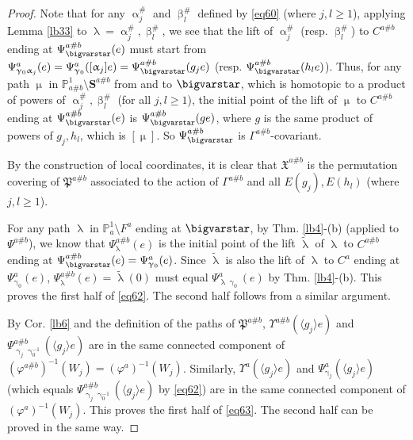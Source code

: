 \documentclass[11pt,b5paper,notitlepage]{article}
\theoremstyle{definition}
\theoremstyle{plain}
\newcommand{\fk}{\mathfrak}
\newcommand{\wtd}{\widetilde}
\newcommand{\bk}[1]{\langle {#1}\rangle}
\newcommand{\Pbb}{\mathbb P}
\newcommand{\Sbf}{\mathbf{S}}
\numberwithin{equation}{subsection}
\begin{document}
\begin{proof}
Note that for any $\upalpha_j^\#$ and $\upbeta_l^\#$ defined by \eqref{eq60} (where $j,l\geq 1$), applying  Lemma \ref{lb33} to $\uplambda=\upalpha_j^\#,\upbeta_l^\#$, we see that the lift of $\upalpha_j^\#$ (resp. $\upbeta_l^\#$) to $C^{a\#b}$ ending at $\Psi_\bigvarstar^{a\#b}(e)$ must start from $\Psi^a_{\upgamma_0\upalpha_j}(e)=\Psi^a_{\upgamma_0}([\upalpha_j]e)=\Psi^{a\#b}_\bigvarstar(g_je)$ (resp. $\Psi^{a\#b}_\bigvarstar(h_le)$). Thus, for any path $\upmu$ in $\Pbb^1_{a\#b}\setminus\Sbf^{a\#b}$ from and to $\bigvarstar$, which is homotopic to a product of powers of $\upalpha_j^\#,\upbeta_l^\#$ (for all $j,l\geq 1$), the initial point of the lift of $\upmu$ to $C^{a\#b}$ ending at $\Psi^{a\#b}_\bigvarstar(e)$ is  $\Psi^{a\#b}_\bigvarstar(ge)$, where $g$ is the same product of powers of $g_j,h_l$, which is $[\upmu]$. So $\Psi^{a\#b}_\bigvarstar$ is $\Gamma^{a\#b}$-covariant. 

By the construction of local coordinates, it is clear that  $\fk X^{a\#b}$ is the permutation covering of $\fk P^{a\#b}$ associated to the action of $\Gamma^{a\#b}$ and all $E(g_j),E(h_l)$ (where $j,l\geq 1$).




For any path $\uplambda$ in $\Pbb^1_a\setminus F^a$ ending at $\bigvarstar$, by Thm. \ref{lb4}-(b) (applied to $\Psi^{a\#b}$), we know that $\Psi_\uplambda^{a\#b}(e)$ is the initial point of the lift $\wtd\uplambda$ of $\uplambda$ to $C^{a\#b}$ ending at $\Psi^{a\#b}_\bigvarstar(e)=\Psi^a_{\upgamma_0}(e)$. Since $\wtd\uplambda$ is also the lift of $\uplambda$ to $C^a$  ending at $\Psi^a_{\upgamma_0}(e)$,  $\Psi_\uplambda^{a\#b}(e)=\wtd\uplambda(0)$ must equal $\Psi^a_{\uplambda\upgamma_0}(e)$ by Thm. \ref{lb4}-(b).   This proves the first half of \eqref{eq62}. The second half follows from a similar argument. 

By Cor. \ref{lb6} and the definition of the paths of $\fk P^{a\#b}$, $\Upsilon^{a\#b}(\bk{g_j}e)$ and $\Psi^{a\#b}_{\upgamma_j\upgamma_0^{-1}}(\bk{g_j}e)$ are in the same connected component of $(\varphi^{a\#b})^{-1}(W_j)=(\varphi^a)^{-1}(W_j)$. Similarly, $\Upsilon^a(\bk{g_j}e)$ and  $\Psi^a_{\upgamma_j}(\bk{g_j}e)$ (which equals $\Psi^{a\#b}_{\upgamma_j\upgamma_0^{-1}}(\bk{g_j}e)$ by \eqref{eq62}) are in the same connected component of $(\varphi^a)^{-1}(W_j)$. This proves the first half of \eqref{eq63}. The second half can be proved in the same way.
\end{proof}
\end{document}

